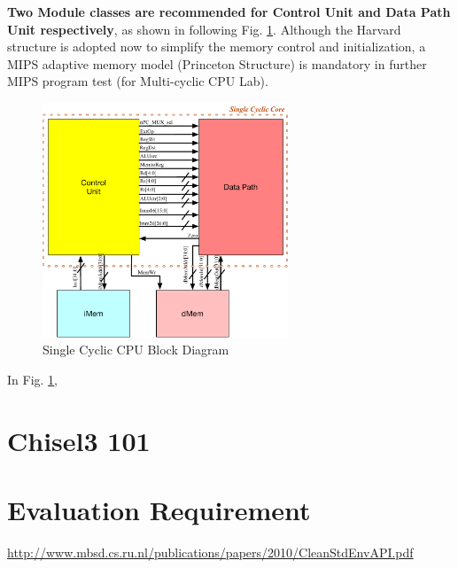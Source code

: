 \documentclass[a4paper]{article}
\begin{document}
\textbf{Two Module classes are recommended for Control Unit and Data Path Unit respectively}, as shown in following Fig. \ref{fig:modules}. Although the Harvard structure is adopted now to simplify the memory control and initialization, a MIPS adaptive memory model (Princeton Structure) is mandatory in further MIPS program test (for Multi-cyclic CPU Lab).  
\begin{figure}[ht]
 \centering
 \includegraphics[height=7cm]{images/l1modules.pdf}
 \caption{Single Cyclic CPU Block Diagram}
 \label{fig:modules}
\end{figure}
In Fig. \ref{fig:modules}, 

\newpage
\section{Chisel3 101} \label{Datatypes}%
	
 

\newpage
\section{Evaluation Requirement} \label{Functions}%

\url{http://www.mbsd.cs.ru.nl/publications/papers/2010/CleanStdEnvAPI.pdf}
\end{document}

